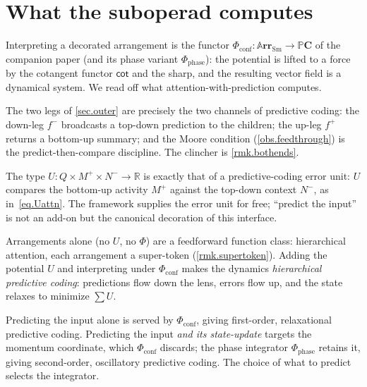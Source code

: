\documentclass[11pt]{article}
\theoremstyle{plain}
\theoremstyle{definition}
\theoremstyle{remark}
\newcommand{\rr}{\mathbb{R}}
\newcommand{\Cat}[1]{\mathbf{#1}}
\newcommand{\Sm}{\mathrm{Sm}}
\newcommand{\arr}{\mathbb{A}\Cat{rr}}    %
\newcommand{\sarr}{\arr_{\Sm}}           %
\newcommand{\pc}{\mathbb{P}\Cat{C}}      %
\newcommand{\inpt}[1]{#1^{-}}
\newcommand{\outp}[1]{#1^{+}}
\renewcommand{\cot}{\mathsf{cot}}        %
\newcommand{\conf}{\mathrm{conf}}
\newcommand{\phase}{\mathrm{phase}}
\newcommand{\Phiconf}{\Phi_{\conf}}
\newcommand{\Phiphase}{\Phi_{\phase}}
\begin{document}
\section{What the suboperad computes}\label{sec.semantics}

Interpreting a decorated arrangement is the functor
$\Phiconf\colon\sarr\to\pc$ of the companion paper (and its phase variant
$\Phiphase$): the potential is lifted to a force by the cotangent functor
$\cot$ and the sharp, and the resulting vector field is a dynamical
system. We read off what attention-with-prediction computes.

The two legs of \cref{sec.outer} are precisely the two channels of
predictive coding: the down-leg $\inpt f$ broadcasts a top-down prediction
to the children; the up-leg $\outp f$ returns a bottom-up summary; and the
Moore condition (\cref{obs.feedthrough}) is the predict-then-compare
discipline. The clincher is \cref{rmk.bothends}.

\begin{observation}\label{obs.erroreunit}
The type $U\colon Q\times\outp M\times\inpt N\to\rr$ is exactly that of a
predictive-coding error unit: $U$ compares the bottom-up activity $\outp M$
against the top-down context $\inpt N$, as in~\eqref{eq.Uattn}. The
framework supplies the error unit for free; ``predict the input'' is not an
add-on but the canonical decoration of this interface.
\end{observation}

\begin{slogan}\label{slo.pc}
Arrangements alone (no $U$, no $\Phi$) are a feedforward function class:
hierarchical attention, each arrangement a super-token
(\cref{rmk.supertoken}). Adding the potential $U$ and interpreting under
$\Phiconf$ makes the dynamics \emph{hierarchical predictive coding}:
predictions flow down the lens, errors flow up, and the state relaxes to
minimize $\textstyle\sum U$.
\end{slogan}

\begin{remark}\label{rmk.order}
Predicting the input alone is served by $\Phiconf$, giving first-order,
relaxational predictive coding. Predicting the input \emph{and its
state-update} targets the momentum coordinate, which $\Phiconf$ discards;
the phase integrator $\Phiphase$ retains it, giving second-order,
oscillatory predictive coding. The choice of what to predict selects the
integrator.
\end{remark}
\end{document}
